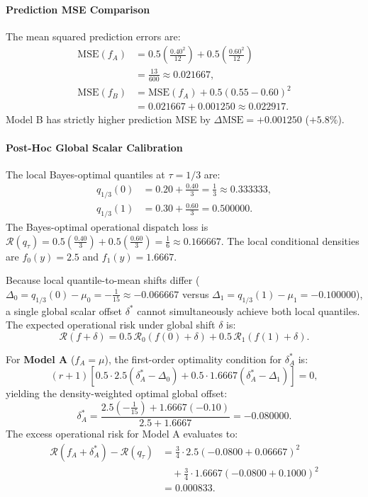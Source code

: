 \paragraph{Prediction MSE Comparison}
The mean squared prediction errors are:
\begin{align}
\text{MSE}(f_A) &= 0.5 \left(\frac{0.40^2}{12}\right) + 0.5 \left(\frac{0.60^2}{12}\right) \nonumber \\
&= \frac{13}{600} \approx 0.021667, \\
\text{MSE}(f_B) &= \text{MSE}(f_A) + 0.5 (0.55 - 0.60)^2 \nonumber \\
&= 0.021667 + 0.001250 \approx 0.022917.
\end{align}
Model B has strictly higher prediction MSE by $\Delta \text{MSE} = +0.001250$ ($+5.8\%$).

\paragraph{Post-Hoc Global Scalar Calibration}
The local Bayes-optimal quantiles at $\tau = 1/3$ are:
\begin{align}
q_{1/3}(0) &= 0.20 + \tfrac{0.40}{3} = \tfrac{1}{3} \approx 0.333333, \\
q_{1/3}(1) &= 0.30 + \tfrac{0.60}{3} = 0.500000.
\end{align}
The Bayes-optimal operational dispatch loss is $\mathcal{R}(q_\tau) = 0.5(\frac{0.40}{3}) + 0.5(\frac{0.60}{3}) = \frac{1}{6} \approx 0.166667$. The local conditional densities are $f_0(y) = 2.5$ and $f_1(y) = 1.6667$.

Because local quantile-to-mean shifts differ ($\Delta_0 = q_{1/3}(0) - \mu_0 = -\frac{1}{15} \approx -0.066667$ versus $\Delta_1 = q_{1/3}(1) - \mu_1 = -0.100000$), a single global scalar offset $\delta^*$ cannot simultaneously achieve both local quantiles. The expected operational risk under global shift $\delta$ is:
\begin{equation}
\mathcal{R}(f + \delta) = 0.5 \, \mathcal{R}_0(f(0) + \delta) + 0.5 \, \mathcal{R}_1(f(1) + \delta).
\end{equation}

For \textbf{Model A} ($f_A = \mu$), the first-order optimality condition for $\delta_A^*$ is:
\begin{equation}
(r+1) \left[ 0.5 \cdot 2.5 (\delta_A^* - \Delta_0) + 0.5 \cdot 1.6667 (\delta_A^* - \Delta_1) \right] = 0,
\end{equation}
yielding the density-weighted optimal global offset:
\begin{equation}
\delta_A^* = \frac{2.5 (-\frac{1}{15}) + 1.6667 (-0.10)}{2.5 + 1.6667} = -0.080000.
\end{equation}
The excess operational risk for Model A evaluates to:
\begin{equation}
\begin{aligned}
\mathcal{R}(f_A + \delta_A^*) - \mathcal{R}(q_\tau) &= \frac{3}{4} \cdot 2.5 (-0.0800 + 0.06667)^2 \\
&\quad + \frac{3}{4} \cdot 1.6667 (-0.0800 + 0.1000)^2 \\
&= 0.000833.
\end{aligned}
\end{equation}

